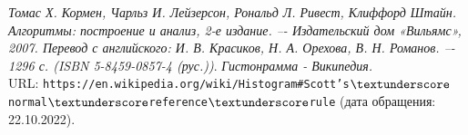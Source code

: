 \begin{thebibliography}{99}
{\itshape Томас Х. Кормен, Чарльз И. Лейзерсон, Рональд Л. Ривест, Клиффорд Штайн.
Алгоритмы: построение и анализ, 2-е издание. –- Издательский дом
«Вильямс», 2007. Перевод с английского: И. В. Красиков, Н. А. Орехова,
В. Н. Романов. –- 1296 с. (ISBN 5-8459-0857-4 (рус.))}.
{\itshape Гистонрамма - Википедия.} \\URL: \texttt{https://en.wikipedia.org/wiki/Histogram#Scott's$\textunderscore$normal$\textunderscore$reference$\textunderscore$rule} (дата обращения: 22.10.2022).
\end{thebibliography}
\pagebreak


